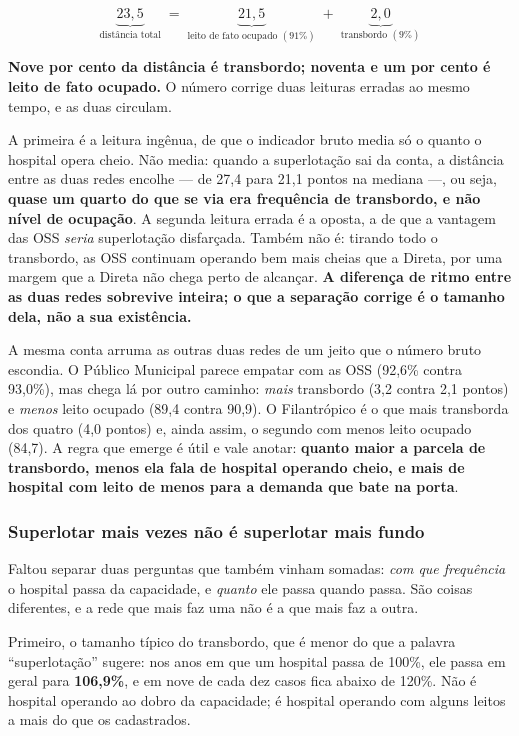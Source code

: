 \begin{equation*}
  \underbrace{23{,}5}_{\text{distância total}}
  \;=\;
  \underbrace{21{,}5}_{\text{leito de fato ocupado }(91\%)}
  \;+\;
  \underbrace{2{,}0}_{\text{transbordo }(9\%)}
\end{equation*}

\textbf{Nove por cento da distância é transbordo; noventa e um por cento é
leito de fato ocupado.} O número corrige duas leituras erradas ao mesmo
tempo, e as duas circulam.

A primeira é a leitura ingênua, de que o indicador bruto media só o quanto o
hospital opera cheio. Não media: quando a superlotação sai da conta, a
distância entre as duas redes encolhe --- de 27,4 para 21,1 pontos na
mediana ---, ou seja, \textbf{quase um quarto do que se via era frequência
de transbordo, e não nível de ocupação}. A segunda leitura errada é a
oposta, a de que a vantagem das OSS \emph{seria} superlotação disfarçada.
Também não é: tirando todo o transbordo, as OSS continuam operando bem mais
cheias que a Direta, por uma margem que a Direta não chega perto de
alcançar. \textbf{A diferença de ritmo entre as duas redes sobrevive
inteira; o que a separação corrige é o tamanho dela, não a sua existência.}

A mesma conta arruma as outras duas redes de um jeito que o número bruto
escondia. O Público Municipal parece empatar com as OSS (92,6\% contra
93,0\%), mas chega lá por outro caminho: \emph{mais} transbordo (3,2 contra
2,1 pontos) e \emph{menos} leito ocupado (89,4 contra 90,9). O Filantrópico
é o que mais transborda dos quatro (4,0 pontos) e, ainda assim, o segundo
com menos leito ocupado (84,7). A regra que emerge é útil e vale anotar:
\textbf{quanto maior a parcela de transbordo, menos ela fala de hospital
operando cheio, e mais de hospital com leito de menos para a demanda que
bate na porta}.

\subsubsection*{Superlotar mais vezes não é superlotar mais fundo}

Faltou separar duas perguntas que também vinham somadas: \emph{com que
frequência} o hospital passa da capacidade, e \emph{quanto} ele passa quando
passa. São coisas diferentes, e a rede que mais faz uma não é a que mais faz
a outra.

Primeiro, o tamanho típico do transbordo, que é menor do que a palavra
``superlotação'' sugere: nos anos em que um hospital passa de 100\%, ele
passa em geral para \textbf{106,9\%}, e em nove de cada dez casos fica
abaixo de 120\%. Não é hospital operando ao dobro da capacidade; é hospital
operando com alguns leitos a mais do que os cadastrados.

